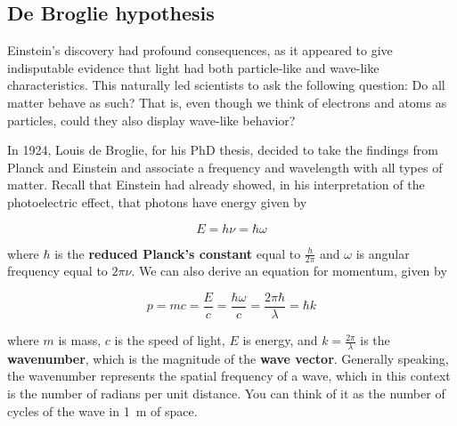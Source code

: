 \subsection{De Broglie hypothesis} \label{sec:db-hyp}

Einstein's discovery had profound consequences, as it appeared to give indisputable evidence that light had both particle-like and wave-like characteristics. 
This naturally led scientists to ask the following question: Do all matter behave as such? 
That is, even though we think of electrons and atoms as particles, could they also display wave-like behavior?

In 1924, Louis de Broglie, for his PhD thesis, decided to take the findings from Planck and Einstein and associate a frequency and wavelength with all types of matter. 
Recall that Einstein had already showed, in his interpretation of the photoelectric effect, that photons have energy given by

\begin{tcolorbox}[title=Energy relationship] \vspace{-2ex}
	\begin{equation}
		E = h\nu = \hbar \omega \label{eq:EdB}
	\end{equation}
\end{tcolorbox}

\noindent where $\hbar$ is the \textbf{reduced Planck's constant} equal to $\frac{h}{2\pi}$ and $\omega$ is angular frequency equal to $2\pi\nu$. 
We can also derive an equation for momentum, given by

\begin{tcolorbox}[title=Momentum relationship] \vspace{-2ex}
	\begin{equation}
		p = mc = \frac{E}{c} = \frac{\hbar\omega}{c} = \frac{2\pi\hbar}{\lambda} = \hbar k \label{eq:pdB}
	\end{equation}
\end{tcolorbox}

\noindent where $m$ is mass, $c$ is the speed of light, $E$ is energy, and $k=\frac{2\pi}{\lambda}$ is the \textbf{wavenumber}, which is the magnitude of the \textbf{wave vector}. 
Generally speaking, the wavenumber represents the spatial frequency of a wave, which in this context is the number of radians per unit distance. 
You can think of it as the number of cycles of the wave in \SI{1}{\meter} of space.

